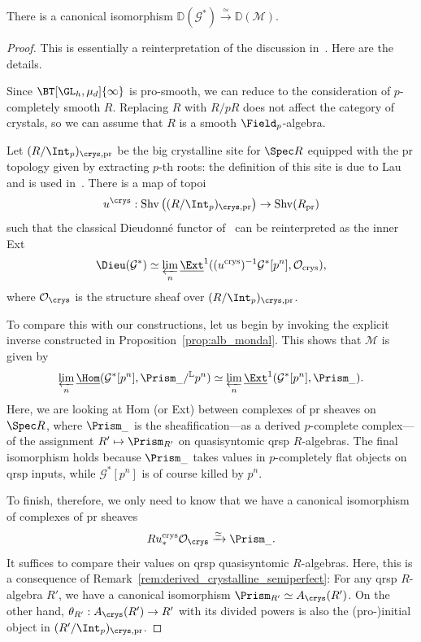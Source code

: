 \documentclass[10pt]{amsart}
\begin{document}
\begin{theorem}
\label{thm:crystalline_comparison}
There is a canonical isomorphism $\mathbb{D}(\mathcal{G}^*)\xrightarrow{\simeq}\mathbb{D}(\mathcal{M})$.
\end{theorem}
\begin{proof}
This is essentially a reinterpretation of the discussion in~\cite[\S 4.3]{MR4530092}. Here are the details.

Since $\BT[\GL_h,\mu_d]{\infty}$ is pro-smooth, we can reduce to the consideration of $p$-completely smooth $R$. Replacing $R$ with $R/pR$ does not affect the category of crystals, so we can assume that $R$ is a smooth $\Field_p$-algebra. 

Let $(R/\Int_p)_{\crys,\mathrm{pr}}$ be the big crystalline site for $\Spec R$ equipped with the pr topology given by extracting $p$-th roots: the definition of this site is due to Lau~\cite{lau2018divided} and is used in~\cite[\S 4.3]{MR4530092}. There is a map of topoi
\[
u^{\crys}:\mathrm{Shv}\left((R/\Int_p)_{\crys,\mathrm{pr}}\right)\to \mathrm{Shv}(R_{\mathrm{pr}})
\]
such that the classical Dieudonn\'e functor of~\cite{bbm:cris_ii} can be reinterpreted as the inner Ext
\[
\Dieu(\mathcal{G}^*) \simeq \varprojlim_n\underline{\Ext}^1((u^{\mathrm{crys}})^{-1}\mathcal{G}^*[p^n],\mathcal{O}_{\mathrm{crys}}),
\]
where $\mathcal{O}_{\crys}$ is the structure sheaf over $(R/\Int_p)_{\crys,\mathrm{pr}}$. 


To compare this with our constructions, let us begin by invoking the explicit inverse constructed in Proposition~\ref{prop:alb_mondal}. This shows that $\mathcal{M}$ is given by
\[
\varprojlim_n\underline{\Hom}(\mathcal{G}^*[p^n],\Prism_{\_}/{}^{\mathbb{L}}p^n)\simeq \varprojlim_n\underline{\Ext}^1(\mathcal{G}^*[p^n],\Prism_{\_}).
\]
Here, we are looking at Hom (or Ext) between complexes of pr sheaves on $\Spec R$, where $\Prism_{\_}$ is the sheafification---as a derived $p$-complete complex---of the assignment $R' \mapsto \Prism_{R'}$ on quasisyntomic qrsp $R$-algebras. The final isomorphism holds because $\Prism_{\_}$ takes values in $p$-completely flat objects on qrsp inputs, while $\mathcal{G}^*[p^n]$ is of course killed by $p^n$.

To finish, therefore, we only need to know that we have a canonical isomorphism of complexes of pr sheaves
\[
Ru^{\mathrm{crys}}_* \mathcal{O}_{\crys}\xrightarrow{\simeq}\Prism_{\_}.
\]
It suffices to compare their values on qrsp quasisyntomic $R$-algebras. Here, this is a consequence of Remark~\ref{rem:derived_crystalline_semiperfect}: For any qrsp $R$-algebra $R'$, we have a canonical isomorphism $\Prism_{R'} \simeq A_{\crys}(R')$. On the other hand, $\theta_{R'}:A_{\crys}(R')\to R'$ with its divided powers is also the (pro-)initial object in $(R'/\Int_p)_{\crys,\mathrm{pr}}$.
\end{proof}
\end{document}
